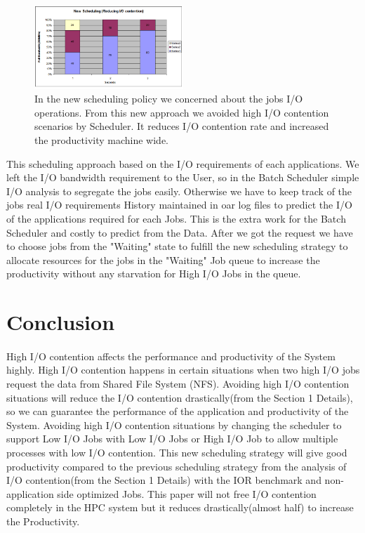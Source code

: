 \documentclass{article}
\begin{document}
\begin{figure}
  \centering    
      \includegraphics[width=0.5\textwidth]{New-Scheduling-Good.png}
  \caption{In the new scheduling policy we concerned about the jobs I/O operations. From this new approach we avoided high I/O contention scenarios by Scheduler. It reduces I/O contention rate and increased the productivity machine wide.}
\end{figure}
This scheduling approach based on the I/O requirements of each applications. We left the I/O bandwidth requirement to the User, so in the Batch Scheduler simple I/O analysis to segregate the jobs easily. Otherwise we have to keep track of the jobs real I/O requirements History maintained in oar log files to predict the I/O of the applications required for each Jobs. This is the extra work for the Batch Scheduler and costly to predict from the Data. After we got the request we have to choose jobs from the "Waiting" state to fulfill the new scheduling strategy to allocate resources for the jobs in the "Waiting" Job queue to increase the productivity without any starvation for High I/O Jobs in the queue.
\section{Conclusion}
\paragraph{}High I/O contention affects the performance and productivity of the System highly. High I/O contention happens in certain situations when two high I/O jobs request the data from Shared File System (NFS). Avoiding high I/O  contention situations will reduce the I/O contention drastically(from the Section 1 Details), so we can guarantee the performance of the application and productivity of the System. Avoiding high I/O  contention situations by changing the scheduler to support Low I/O Jobs with Low I/O Jobs or High I/O Job to allow multiple processes with low I/O contention. This new scheduling strategy will give good productivity compared to the previous scheduling strategy from the analysis of I/O contention(from the Section 1 Details) with the IOR benchmark and non-application side optimized Jobs. This paper will not free I/O contention completely in the HPC system but it reduces drastically(almost half) to increase the Productivity.   
\end{document}
